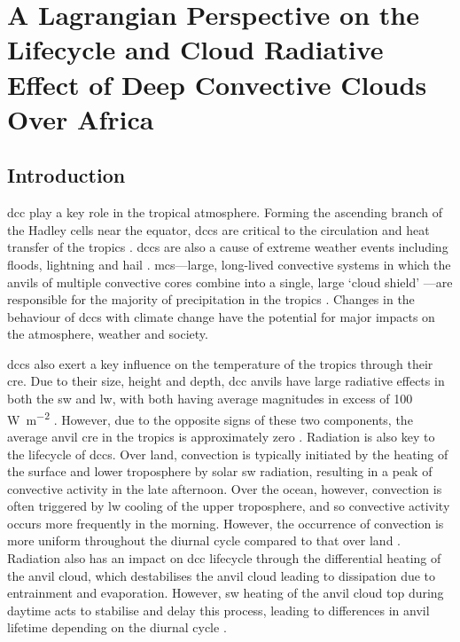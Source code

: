 \chapter{A Lagrangian Perspective on the Lifecycle and Cloud Radiative Effect of Deep Convective Clouds Over Africa} \label{chp:radiative_effect}



\section{Introduction}  %
\acrshort{dcc} play a key role in the tropical atmosphere. 
Forming the ascending branch of the Hadley cells near the equator, \acrshort{dcc}s are critical to the circulation and heat transfer of the tropics \citep{riehl_heat_1958, weisman_mesoscale_2015}. 
\acrshort{dcc}s are also a cause of extreme weather events including floods, lightning and hail \citep{westra_future_2014}. 
\acrshort{mcs}---large, long-lived convective systems in which the anvils of multiple convective cores combine into a single, large `cloud shield' \citep{chen_diurnal_1997, houze_mesoscale_2004, roca_simple_2017}---are responsible for the majority of precipitation in the tropics \citep{feng_global_2021}. 
Changes in the behaviour of \acrshort{dcc}s with climate change have the potential for major impacts on the atmosphere, weather and society.

\acrshort{dcc}s also exert a key influence on the temperature of the tropics through their \acrshort{cre}. 
Due to their size, height and depth, \acrshort{dcc} anvils have large radiative effects in both the \acrshort{sw} and \acrshort{lw}, with both having average magnitudes in excess of 100\,\unit{W m^{-2}} \citep{hartmann_tropical_2016, wall_balanced_2018}. 
However, due to the opposite signs of these two components, the average anvil \acrshort{cre} in the tropics is approximately zero \citep{ramanathan_cloud-radiative_1989, hartmann_effect_1992, stephens_cloudsat_2018}. 
Radiation is also key to the lifecycle of \acrshort{dcc}s. 
Over land, convection is typically initiated by the heating of the surface and lower troposphere by solar \acrshort{sw} radiation, resulting in a peak of convective activity in the late afternoon. 
Over the ocean, however, convection is often triggered by \acrshort{lw} cooling of the upper troposphere, and so convective activity occurs more frequently in the morning. 
However, the occurrence of convection is more uniform throughout the diurnal cycle compared to that over land \citep{taylor_evaluating_2017}. 
Radiation also has an impact on \acrshort{dcc} lifecycle through the differential heating of the anvil cloud, which destabilises the anvil cloud leading to dissipation due to entrainment and evaporation. 
However, \acrshort{sw} heating of the anvil cloud top during daytime acts to stabilise and delay this process, leading to differences in anvil lifetime depending on the diurnal cycle \citep{harrop_role_2016, sokol_tropical_2020, wall_observational_2020}.

